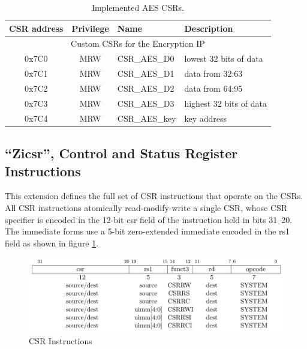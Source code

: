\documentclass[../main.tex]{subfiles}
\begin{document}
\begin{table}[t!]
\centering
\begin{tabular}{ |c|c|p{3.5cm}| p{6.2cm}|} 
\hline
CSR address & Privilege & Name & Description \\
\hline
\multicolumn{4}{|c|}{Custom CSRs for the Encryption IP}\\
\hline
0x7C0 & MRW & CSR\_AES\_D0 & lowest 32 bits of data\\
0x7C1 & MRW & CSR\_AES\_D1 & data from 32:63\\
0x7C2 & MRW & CSR\_AES\_D2 & data from 64:95\\
0x7C3 & MRW & CSR\_AES\_D3 & highest 32 bits of data\\
0x7C4 & MRW & CSR\_AES\_key & key address\\
\hline
\end{tabular}
\caption{Implemented AES CSRs.}
\label{tab:CSRs2}
\end{table}

\subsection{“Zicsr”, Control and Status Register Instructions}
This extension defines the full set of CSR instructions that operate on the CSRs.\\
\newline
\noindent All CSR instructions atomically read-modify-write a single CSR, whose CSR specifier is encoded in the 12-bit csr field of the instruction held in bits 31–20. The immediate forms use a 5-bit zero-extended immediate encoded in the rs1 field as shown in figure \ref{fig:csr_inst}.

\begin{figure}[t]
\centering
\includegraphics[width=15 cm]{diagrams/csr_inst.png}
\caption{CSR Instructions}
\label{fig:csr_inst}
\end{figure}
\end{document}
